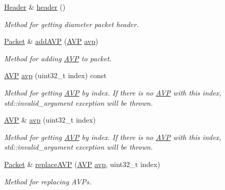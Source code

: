\begin{DoxyCompactItemize}
\hyperlink{classDiameter_1_1Packet_1_1Header}{Header} \& \hyperlink{classDiameter_1_1Packet_a33d371227da437251b2875baa5a97dbd}{header} ()
\begin{DoxyCompactList}\small\item\em Method for getting diameter packet header. \end{DoxyCompactList}\item 
\hyperlink{classDiameter_1_1Packet}{Packet} \& \hyperlink{classDiameter_1_1Packet_a36d19bb1e2ff1517dea5927bd77cc7b9}{add\+A\+VP} (\hyperlink{classDiameter_1_1AVP}{A\+VP} \hyperlink{classDiameter_1_1Packet_a5a3cc851ef92ab67f975155d2ac7dad9}{avp})
\begin{DoxyCompactList}\small\item\em Method for adding \hyperlink{classDiameter_1_1AVP}{A\+VP} to packet. \end{DoxyCompactList}\item 
\hyperlink{classDiameter_1_1AVP}{A\+VP} \hyperlink{classDiameter_1_1Packet_a5a3cc851ef92ab67f975155d2ac7dad9}{avp} (uint32\+\_\+t index) const
\begin{DoxyCompactList}\small\item\em Method for getting \hyperlink{classDiameter_1_1AVP}{A\+VP} by index. If there is no \hyperlink{classDiameter_1_1AVP}{A\+VP} with this index, std\+::invalid\+\_\+argument exception will be thrown. \end{DoxyCompactList}\item 
\hyperlink{classDiameter_1_1AVP}{A\+VP} \& \hyperlink{classDiameter_1_1Packet_ad6ef3d9705751366b4d04cfb3344f0ca}{avp} (uint32\+\_\+t index)
\begin{DoxyCompactList}\small\item\em Method for getting \hyperlink{classDiameter_1_1AVP}{A\+VP} by index. If there is no \hyperlink{classDiameter_1_1AVP}{A\+VP} with this index, std\+::invalid\+\_\+argument exception will be thrown. \end{DoxyCompactList}\item 
\hyperlink{classDiameter_1_1Packet}{Packet} \& \hyperlink{classDiameter_1_1Packet_afc303623a41f1bc454dfe6b711c47c33}{replace\+A\+VP} (\hyperlink{classDiameter_1_1AVP}{A\+VP} \hyperlink{classDiameter_1_1Packet_a5a3cc851ef92ab67f975155d2ac7dad9}{avp}, uint32\+\_\+t index)
\begin{DoxyCompactList}\small\item\em Method for replacing A\+V\+Ps. \end{DoxyCompactList}\item 

\end{DoxyCompactItemize}
